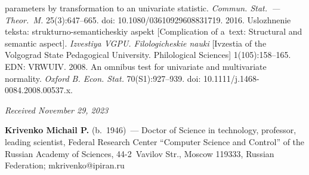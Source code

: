 \begin{multicols}{2}
{{\begin{thebibliography}{99}
parameters by transformation to an univariate statistic. \textit{Commun. Stat.~--- 
Theor.~M.} 25(3):647--665. doi: 10.1080/03610929608831719.
 2016. Uslozhnenie teksta: strukturno-semanticheskiy aspekt 
[Complication of a~text: Structural and semantic aspect]. \textit{Izvestiya VGPU. 
Filologicheskie nauki} [Ivzestia of the Volgograd State Pedagogical University. 
Philological Sciences] 1(105):158--165. EDN: \mbox{VRWUIV}.
 2008. An omnibus test for univariate and 
multivariate normality. \textit{Oxford B. Econ. Stat.} 70(S1):927--939. doi: 
10.1111/j.1468-0084.2008.00537.x.

\end{thebibliography}

 }
 }

\end{multicols}

\vspace*{-6pt}

\hfill{\small\textit{Received November 29, 2023}} 

\vspace*{-18pt}


\Contrl

\vspace*{-3pt}

\noindent
\textbf{Krivenko Michail P.} (b.\ 1946)~--- Doctor of Science in technology, professor, 
leading scientist, Federal Research Center ``Computer Science and Control'' of the 
Russian Academy of Sciences, 44-2~Vavilov Str., Moscow 119333, Russian Federation; 
\mbox{mkrivenko@ipiran.ru}




\label{end\stat}

\renewcommand{\bibname}{\protect\rm Литература} 
